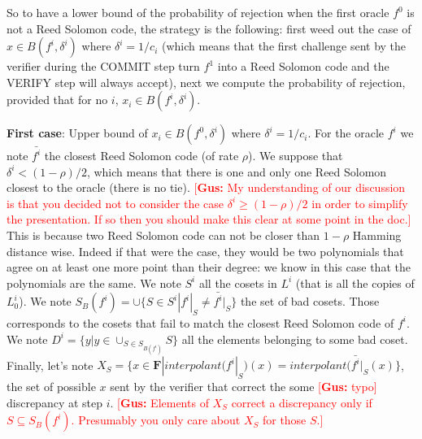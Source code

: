 \documentclass[12pt]{extarticle}
\newcommand{\<}{\langle}
\renewcommand{\>}{\rangle}
\theoremstyle{definition}
\newcommand{\gus}[1]{\textcolor{red}{[\textbf{Gus:} #1]}}
\begin{document}
So to have a lower bound of the probability of rejection when the first oracle $f^0$ is not a Reed Solomon code, the strategy is the following: first weed out the case of $x\in B(f^i,\delta^i)$ where $\delta^i=1/c_i$ (which means that the first challenge sent by the verifier during the COMMIT step turn $f^1$ into a Reed Solomon code and the VERIFY step will always accept), next we compute the probability of rejection, provided that for no $i$, $x_i\in B(f^i,\delta^i)$.

\textbf{First case}: Upper bound of $x_i\in B(f^0,\delta^i)$ where $\delta^i=1/c_i$. For the oracle $f^i$ we note $\bar{f^i}$ the closest Reed Solomon code (of rate $\rho$). We suppose that $\delta^i<(1-\rho)/2$, which means that there is one and only one Reed Solomon closest to the oracle (there is no tie).
\gus{My understanding of our discussion is that you decided not to consider the case $\delta^i\geq(1-\rho)/2$ in order to simplify the presentation.  If so then you should make this clear at some point in the doc.}
This is because two Reed Solomon code can not be closer than $1-\rho$ Hamming distance wise. Indeed if that were the case, they would be two polynomials that agree on at least one more point than their degree: we know in this case that the polynomials are the same. We note $S^i$ all the cosets in $L^i$ (that is all the copies of $L^i_0$). We note $S_B(f^i)=\cup\{S\in S^i|f^i|_S\neq\bar{f^i}|_S\}$ the set of bad cosets. Those corresponds to the cosets that fail to match the closest Reed Solomon code of $f^i$. We note $D^i=\{y|y\in\cup_{S\in S_{B(f^i)}}S\}$ all the elements belonging to some bad coset. Finally, let's note $X_S=\{x\in\mathbf{F}|interpolant(f^i|_S)(x)=interpolant(\bar{f^i}|_S(x)\}$, the set of possible $x$ sent by the verifier that correct the some \gus{typo} discrepancy at step $i$.
\gus{Elements of $X_S$ correct a discrepancy only if $S\subseteq S_B(f^i)$.  Presumably you only care about $X_S$ for those $S$.}
\end{document}

